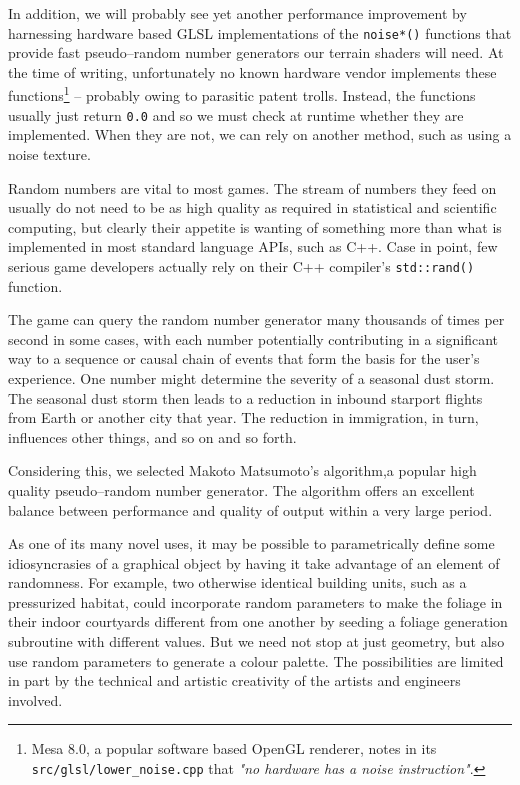 In addition, we will probably see yet another performance improvement by harnessing hardware based GLSL implementations of the {\tt noise*()} functions that provide fast pseudo--random number generators our terrain shaders will need. At the time of writing, unfortunately no known hardware vendor implements these functions\footnote{Mesa 8.0, a popular software based OpenGL renderer, notes in its {\tt src/glsl/lower_noise.cpp} that {\it "no hardware has a noise instruction"}.} -- probably owing to parasitic patent trolls. Instead, the functions usually just return {\tt 0.0} and so we must check at runtime whether they are implemented. When they are not, we can rely on another method, such as using a noise texture.

Random numbers are vital to most games. The stream of numbers they feed on usually do not need to be as high quality as required in statistical and scientific computing, but clearly their appetite is wanting of something more than what is implemented in most standard language APIs, such as C++. Case in point, few serious game developers actually rely on their C++ compiler's {\tt std::rand()} function.

The game can query the random number generator many thousands of times per second in some cases, with each number potentially contributing in a significant way to a sequence or causal chain of events that form the basis for the user's experience. One number might determine the severity of a seasonal dust storm. The seasonal dust storm then leads to a reduction in inbound starport flights from Earth or another city that year. The reduction in immigration, in turn, influences other things, and so on and so forth.

Considering this, we selected Makoto Matsumoto's algorithm, a popular high quality pseudo--random number generator. The algorithm offers an excellent balance between performance and quality of output within a very large period.

As one of its many novel uses, it may be possible to parametrically define some idiosyncrasies of a graphical object by having it take advantage of an element of randomness. For example, two otherwise identical building units, such as a pressurized habitat, could incorporate random parameters to make the foliage in their indoor courtyards different from one another by seeding a foliage generation subroutine with different values. But we need not stop at just geometry, but also use random parameters to generate a colour palette. The possibilities are limited in part by the technical and artistic creativity of the artists and engineers involved.

